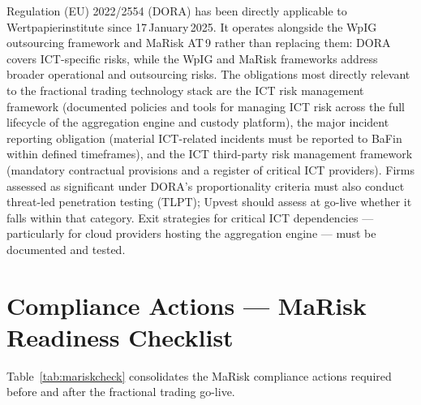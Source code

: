 \documentclass[12pt,a4paper]{report}
\begin{document}
Regulation (EU) 2022/2554 (DORA) has been directly applicable to Wertpapierinstitute
since 17\,January\,2025. It operates alongside the WpIG outsourcing framework
and MaRisk AT\,9 rather than replacing them: DORA covers ICT-specific risks,
while the WpIG and MaRisk frameworks address broader operational and outsourcing
risks. The obligations most directly relevant to the fractional trading
technology stack are the ICT risk management framework (documented policies and
tools for managing ICT risk across the full lifecycle of the aggregation engine
and custody platform), the major incident reporting obligation (material
ICT-related incidents must be reported to BaFin within defined timeframes),
and the ICT third-party risk management framework (mandatory contractual
provisions and a register of critical ICT providers). Firms assessed as
significant under DORA's proportionality criteria must also conduct
threat-led penetration testing (TLPT); Upvest should assess at go-live whether
it falls within that category. Exit strategies for critical ICT dependencies ---
particularly for cloud providers hosting the aggregation engine --- must be
documented and tested.

\section{Compliance Actions --- MaRisk Readiness Checklist}
\label{sec:mariskactions}

Table~\ref{tab:mariskcheck} consolidates the MaRisk compliance actions required
before and after the fractional trading go-live.
\end{document}
